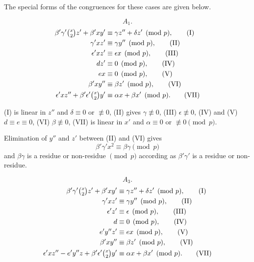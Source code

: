 \documentclass[oneside]{article}
\begin{document}
The special forms of the congruences for these cases are given below.

\medskip
\begin{equation*} A_1. \end{equation*}
\begin{align*}
\beta'\gamma'\tbinom{x}{2}z' + \beta'xy'
             &\equiv \gamma z'' + \delta z' \pmod{p}, \tag{I} \\
  \gamma'xz' &\equiv \gamma y'' \pmod{p},             \tag{II} \\
\epsilon'xz' &\equiv \epsilon x \pmod{p},             \tag{III} \\
         dz' &\equiv 0 \pmod{p},                      \tag{IV} \\
          ex &\equiv 0 \pmod{p},                      \tag{V} \\
  \beta'xy'' &\equiv \beta z' \pmod{p},               \tag{VI} \\
\epsilon'xz'' + \beta'\epsilon'\tbinom{x}{2}y'
             &\equiv \alpha x + \beta x' \pmod{p}.    \tag{VII}
\end{align*}

(I) is linear in $z''$ and $\delta \equiv 0$ or $\not\equiv 0$, (II)
gives $\gamma \not\equiv 0$, (III) $\epsilon \not\equiv 0$, (IV) and (V)
$d \equiv e \equiv 0$, (VI) $\beta \not\equiv 0$, (VII) is linear in $x'$
and $\alpha \equiv 0$ or $\not\equiv 0 \pmod{p}$.

Elimination of $y''$ and $z'$ between (II) and (VI) gives
\begin{equation*}
\beta'\gamma'x^2 \equiv \beta\gamma \pmod{p}
\end{equation*}
\noindent and $\beta\gamma$ is a residue or non-residue $\pmod{p}$ according as
$\beta'\gamma'$ is a residue or non-residue.

\medskip
\begin{equation*} A_3. \end{equation*}
\begin{align*}
\beta'\gamma'\tbinom{x}{2}z' + \beta'xy'
            &\equiv \gamma z'' + \delta z' \pmod{p}, \tag{I} \\
 \gamma'xz' &\equiv \gamma y'' \pmod{p},             \tag{II} \\
\epsilon'z' &\equiv \epsilon \pmod{p},               \tag{III} \\
          d &\equiv 0 \pmod{p},                      \tag{IV} \\
    e'y''z' &\equiv ex \pmod{p},                     \tag{V} \\
 \beta'xy'' &\equiv \beta z' \pmod{p},               \tag{VI} \\
\epsilon'xz'' - e'y''z + \beta'\epsilon'\tbinom{x}{2}y'
            &\equiv \alpha x + \beta x' \pmod{p}.    \tag{VII}
\end{align*}
\end{document}
